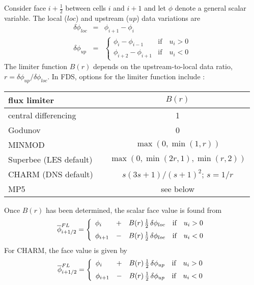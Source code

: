 Consider face $i+\frac{1}{2}$ between cells $i$ and $i+1$ and let $\phi$ denote a general scalar variable.  The local ($loc$) and upstream ($up$) data variations are
\begin{eqnarray}
\delta \phi_{loc} &=& \phi_{i+1}-\phi_i \\
\delta \phi_{up}  &=& \left\{ \begin{array}{ll} \phi_i-\phi_{i-1} & \mbox{if} \quad u_i>0 \\ \phi_{i+2}-\phi_{i+1} & \mbox{if} \quad u_i<0 \end{array} \right. 
\end{eqnarray}
The limiter function $B(r)$ depends on the upstream-to-local data ratio, $r=\delta \phi_{up}/\delta \phi_{loc}$. In FDS, options for the limiter function include \cite{Toro}:

\begin{table}[h!]
\begin{center}
\begin{tabular}{lcc}
flux limiter          && $B(r)$ \\
\hline
central differencing     && 1      \\
Godunov                  && 0      \\
MINMOD                   && $\max(0,\min(1,r))$ \\
Superbee \cite{Roe:1986} (LES default) && $\max(0,\min(2r,1),\min(r,2))$ \\
CHARM \cite{Zhou:1995} (DNS default)   && $s(3s+1)/(s+1)^2$; $s=1/r$ \\
MP5 \cite{Suresh:1997}   && see below
\end{tabular}
\end{center}
\end{table}

Once $B(r)$ has been determined, the scalar face value is found from
\begin{equation}
\label{eqn_flux_limiter}
\overline{\phi}^{FL}_{i+1/2} = \left\{ \begin{array}{lcll} \phi_i &+& B(r) \,\frac{1}{2} \,\delta \phi_{loc} & \mbox{if} \quad u_i>0 \vspace{0.2 cm}\\
\phi_{i+1} &-& B(r) \,\frac{1}{2} \,\delta \phi_{loc} & \mbox{if} \quad u_i<0 \end{array} \right.
\end{equation}
For CHARM, the face value is given by~\cite{Kempf:2003}
\begin{equation}
\label{eqn_charm_limiter}
\overline{\phi}^{FL}_{i+1/2} = \left\{ \begin{array}{lcll} \phi_i &+& B(r) \,\frac{1}{2} \,\delta \phi_{up} & \mbox{if} \quad u_i>0 \vspace{0.2 cm}\\
\phi_{i+1} &-& B(r) \,\frac{1}{2} \,\delta \phi_{up} & \mbox{if} \quad u_i<0 \end{array} \right.
\end{equation}

